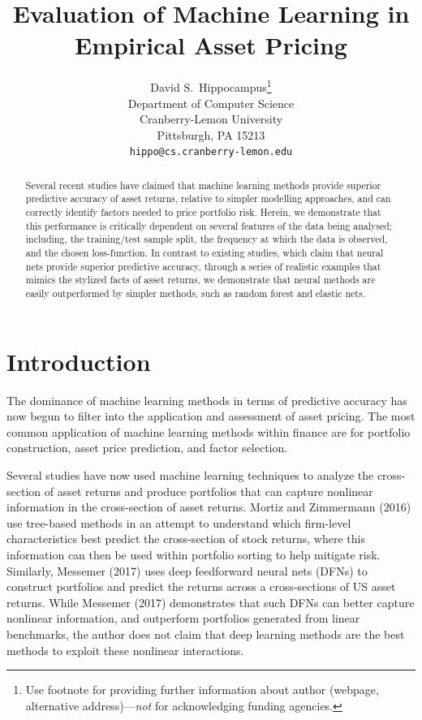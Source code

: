 \documentclass{article}
\title{Evaluation of Machine Learning in Empirical Asset Pricing}
\author{%
  David S.~Hippocampus\thanks{Use footnote for providing further information
    about author (webpage, alternative address)---\emph{not} for acknowledging
    funding agencies.} \\
  Department of Computer Science\\
  Cranberry-Lemon University\\
  Pittsburgh, PA 15213 \\
  \texttt{hippo@cs.cranberry-lemon.edu} \\
}
\begin{document}
\maketitle

\begin{abstract}
	Several recent studies have claimed that machine learning methods provide superior predictive accuracy of asset returns, relative to simpler modelling approaches, and can correctly identify factors needed to price portfolio risk. Herein, we demonstrate that this performance is critically dependent on several features of the data being analysed; including, the training/test sample split, the frequency at which the data is observed, and the chosen loss-function. In contrast to existing studies, which claim that neural nets provide superior predictive accuracy, through a series of realistic examples that mimics the stylized facts of asset returns, we demonstrate that neural methods are easily outperformed by simpler methods, such as random forest and elastic nets.
\end{abstract}

\section{Introduction}
The dominance of machine learning methods in terms of predictive accuracy has now begun to filter into the application and assessment of asset pricing. The most common application of machine learning methods within finance are for portfolio construction, asset price prediction, and factor selection. 

Several studies have now used machine learning techniques to analyze the cross-section of asset returns and produce portfolios that can capture nonlinear information in the cross-section of asset returns. Mortiz and Zimmermann (2016) use tree-based methods in an attempt to understand which firm-level characteristics best predict the cross-section of stock returns, where this information can then be used within portfolio sorting to help mitigate risk. Similarly, Messemer (2017) uses deep feedforward neural nets (DFNs) to construct portfolios and predict the returns across a cross-sections of US asset returns. While Messemer (2017) demonstrates that such DFNs can better capture nonlinear information, and outperform portfolios generated from linear benchmarks, the author does not claim that deep learning methods are the best methods to exploit these nonlinear interactions. 
\end{document}
